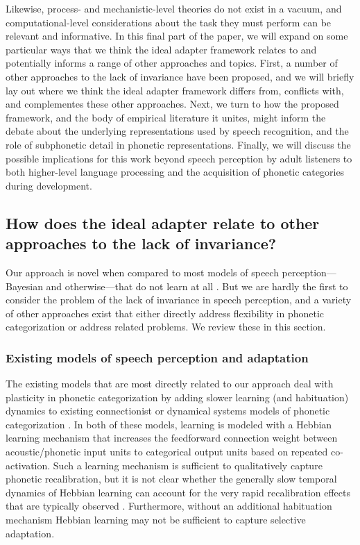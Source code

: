 Likewise, process- and mechanistic-level theories do not exist in a vacuum, and computational-level considerations about the task they must perform can be relevant and informative.
In this final part of the paper, we will expand on some particular ways that we think the ideal adapter framework relates to and potentially informs a range of other approaches and topics.
First, a number of other approaches to the lack of invariance have been proposed, and we will briefly lay out where we think the ideal adapter framework differs from, conflicts with, and complementes these other approaches.
Next, we turn to how the proposed framework, and the body of empirical literature it unites, might inform the debate about the underlying representations used by speech recognition, and the role of subphonetic detail in phonetic representations.
Finally, we will discuss the possible implications for this work beyond speech perception by adult listeners to both higher-level language processing and the acquisition of phonetic categories during development.

\subsection{How does the ideal adapter relate to other approaches to the lack of invariance?}
\label{sec:how-does-ideal-1}
\label{r2-part3-sec}

Our approach is novel when compared to most models of speech perception---Bayesian and otherwise---that do not learn at all \autocite{Clayards2008,Feldman2009a,McClelland1986,Norris1994,Norris2000}.  
But we are hardly the first to consider the problem of the lack of invariance in speech perception, and a variety of other approaches exist that either directly address flexibility in phonetic categorization or address related problems.  We review these in this section.

\subsubsection{Existing models of speech perception and adaptation}
\label{sec:exist-models-adapt}

The existing models that are most directly related to our approach deal with plasticity in phonetic categorization by adding slower learning (and habituation) dynamics to existing connectionist or dynamical systems models of phonetic categorization \autocite{Lancia2013,Mirman2006}.  In both of these models, learning is modeled with a Hebbian learning mechanism that increases the feedforward connection weight between acoustic/phonetic input units to categorical output units based on repeated co-activation.  Such a learning mechanism is sufficient to qualitatively capture phonetic recalibration, but it is not clear whether the generally slow temporal dynamics of Hebbian learning can account for the very rapid recalibration effects that are typically observed \autocite{Guediche2014}.  Furthermore, without an additional habituation mechanism \autocite[which \emph{is} present in][]{Lancia2013} Hebbian learning may not be sufficient to capture selective adaptation.  

